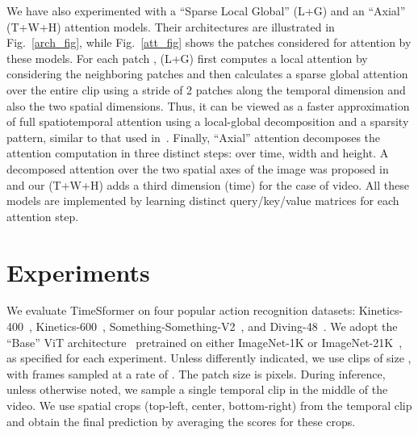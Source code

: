 \documentclass{article}
\begin{document}
We have also experimented with a ``Sparse Local Global'' (L+G) and an ``Axial'' (T+W+H) attention models. Their architectures are illustrated in Fig.~\ref{arch_fig}, while Fig.~\ref{att_fig} shows the patches considered for attention by these models. For each patch , (L+G) first computes a local attention by considering the neighboring  patches and then calculates a sparse global attention over the entire clip using a stride of 2 patches along the temporal dimension and also the two spatial dimensions. Thus, it can be viewed as a faster approximation of full spatiotemporal attention using a local-global decomposition and a sparsity pattern, similar to that used in~\cite{Child:OpenAI}. Finally, ``Axial'' attention decomposes the attention computation in three distinct steps: over time, width and height. A decomposed attention over the two spatial axes of the image was proposed in~\cite{Ho:Axial, huang2018ccnet, Wang:Axial} and our (T+W+H) adds a third dimension (time) for the case of video. All these models are implemented by learning distinct query/key/value matrices for each attention step. 









\section{Experiments}





We evaluate TimeSformer on four popular action recognition datasets: Kinetics-400~\cite{DBLP:conf/cvpr/CarreiraZ17}, Kinetics-600~\cite{DBLP:journals/corr/abs-1808-01340}, Something-Something-V2~\cite{DBLP:journals/corr/GoyalKMMWKHFYMH17}, and Diving-48~\cite{Li_2018_ECCV}. We adopt the ``Base'' ViT architecture~\cite{Dosovitskiy:ICLR2021} pretrained on either ImageNet-1K or ImageNet-21K~\cite{5206848}, as specified for each experiment. Unless  differently indicated, we use clips of size , with frames sampled at a rate of . The patch size is  pixels. During inference, unless otherwise noted, 
we sample a single temporal clip in the middle of the video. We use  spatial crops (top-left, center, bottom-right) from the temporal clip and obtain the final prediction by averaging the scores for these  crops. 
\end{document}
